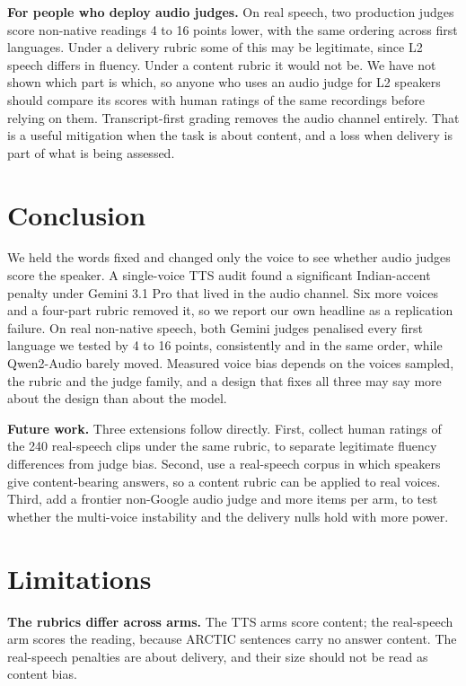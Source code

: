 \textbf{For people who deploy audio judges.} On real speech, two production judges score non-native readings 4 to 16 points lower, with the same ordering across first languages. Under a delivery rubric some of this may be legitimate, since L2 speech differs in fluency. Under a content rubric it would not be. We have not shown which part is which, so anyone who uses an audio judge for L2 speakers should compare its scores with human ratings of the same recordings before relying on them. Transcript-first grading removes the audio channel entirely. That is a useful mitigation when the task is about content, and a loss when delivery is part of what is being assessed.

\section{Conclusion}

We held the words fixed and changed only the voice to see whether audio judges score the speaker. A single-voice TTS audit found a significant Indian-accent penalty under Gemini 3.1 Pro that lived in the audio channel. Six more voices and a four-part rubric removed it, so we report our own headline as a replication failure. On real non-native speech, both Gemini judges penalised every first language we tested by 4 to 16 points, consistently and in the same order, while Qwen2-Audio barely moved. Measured voice bias depends on the voices sampled, the rubric and the judge family, and a design that fixes all three may say more about the design than about the model.

\textbf{Future work.} Three extensions follow directly. First, collect human ratings of the 240 real-speech clips under the same rubric, to separate legitimate fluency differences from judge bias. Second, use a real-speech corpus in which speakers give content-bearing answers, so a content rubric can be applied to real voices. Third, add a frontier non-Google audio judge and more items per arm, to test whether the multi-voice instability and the delivery nulls hold with more power.

\section*{Limitations}

\textbf{The rubrics differ across arms.} The TTS arms score content; the real-speech arm scores the reading, because ARCTIC sentences carry no answer content. The real-speech penalties are about delivery, and their size should not be read as content bias.

